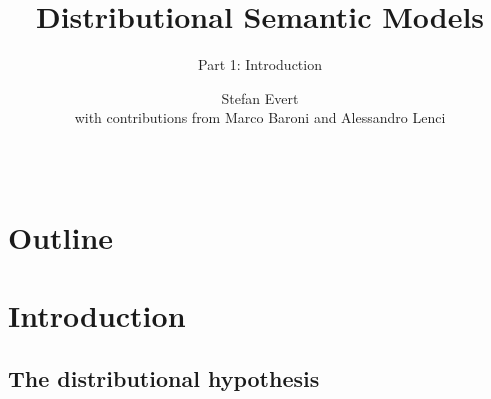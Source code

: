 \usepackage{etex}

\usepackage{beamer-tools-dsm}




\title[DSM Tutorial -- Part 1]{Distributional Semantic Models}
\subtitle{Part 1: Introduction}
\author[\textcopyright\ Evert/Baroni/Lenci]{%
  Stefan Evert\\
  {\small with contributions from Marco Baroni and Alessandro Lenci}}

\date[wordspace.collocations.de]{
  \href{http://wordspace.collocations.de/doku.php/course:start}{}\\
  \light{\tiny \dsmcopyright}}



\showLogo
\frame{\titlepage}
\hideLogo


\section*{Outline}

\section{Introduction}

\subsection{The distributional hypothesis}

